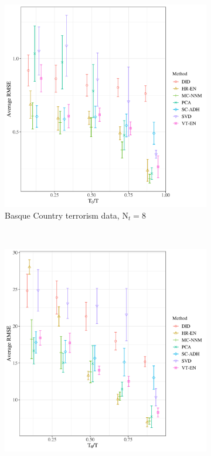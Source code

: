 \documentclass[hidelinks,12pt]{article}
\begin{document}
\begin{figure}[htbp]
	\centering
	\begin{subfigure}[t]{0.48\textwidth}
		\centering
		\includegraphics[width=\textwidth]{plots/basque_N_16_T_43_numruns_20_num_treated_8_simultaneuous_0.png}
		\caption{Basque Country terrorism data, $\text{N}_t = 8$} 
	\end{subfigure}
	~ 
	\begin{subfigure}[t]{0.48\textwidth}
		\centering
		\includegraphics[width=\textwidth]{plots/california_N_38_T_31_numruns_20_num_treated_19_simultaneuous_0.png}

\end{subfigure}
\end{figure}
\end{document}
